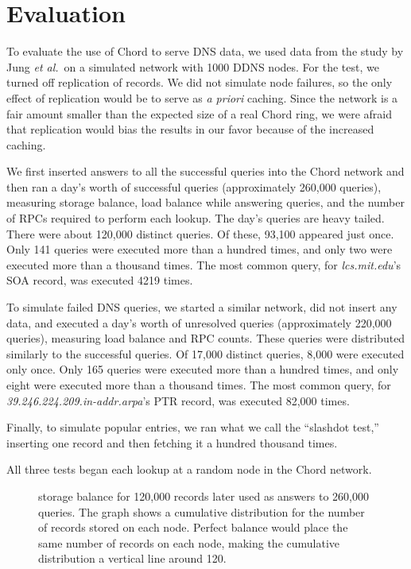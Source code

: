 \section{Evaluation}

To evaluate the use of Chord to serve DNS data,
we used data from the study by Jung {\em et al.}\ on
a simulated network with 1000 DDNS nodes.
For the test, we turned off replication of records.
We did not simulate node failures,
so the only effect of replication would be to serve
as {\em a priori} caching.
Since the network is a fair amount smaller than the expected
size of a real Chord ring, we were afraid that replication would
bias the results in our favor because of the increased caching.

We first inserted answers to all the successful queries into the Chord network
and then ran a day's worth of successful queries
(approximately 260,000 queries),
measuring storage balance, load balance while answering
queries, and the number of RPCs required to perform each lookup.
The day's queries are heavy tailed.
There were about 120,000 distinct queries.  Of these, 93,100 appeared
just once.
Only 141 queries were executed more than a hundred times,
and only two were executed more than a thousand times.
The most common query, for {\em lcs.mit.edu}'s SOA record,
was executed 4219 times.

To simulate failed DNS queries, we started a similar network, did not insert
any data, and executed a day's worth of unresolved queries (approximately
220,000 queries), measuring
load balance and RPC counts.
These queries were distributed similarly to the successful queries.
Of 17,000 distinct queries, 8,000 were executed only once.
Only 165 queries were executed more than a hundred times,
and only eight were executed more than a thousand times.
The most common query, for {\em 39.246.224.209.in-addr.arpa}'s
PTR record, was executed 82,000 times.

Finally, to simulate popular entries, we ran what we call the ``slashdot test,''
inserting one record and then fetching it a hundred thousand times.

All three tests began each lookup at a random node in the Chord network.

\begin{figure}
\caption{
storage balance for 120,000 records later used as answers to
260,000 queries.
The graph shows a cumulative distribution for the number 
of records stored on each node.
Perfect balance would place the same number of records
on each node, making the cumulative distribution a vertical line
around 120.}
\label{fig:store}
\end{figure}

